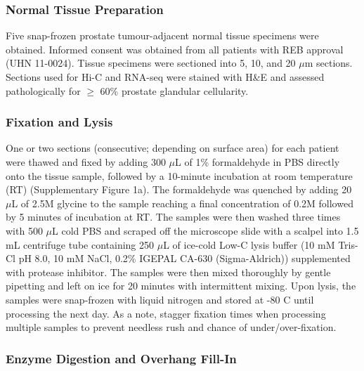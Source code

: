 \subsubsection{Normal Tissue Preparation}

Five snap-frozen prostate tumour-adjacent normal tissue specimens were obtained.
Informed consent was obtained from all patients with REB approval (UHN 11-0024).
Tissue specimens were sectioned into 5, 10, and 20 $\mu$m sections.
Sections used for Hi-C and RNA-seq were stained with H\&E and assessed pathologically for $\ge$ 60\% prostate glandular cellularity.

\subsubsection{Fixation and Lysis}

One or two sections (consecutive; depending on surface area) for each patient were thawed and fixed by adding 300 $\mu$L of 1\% formaldehyde in PBS directly onto the tissue sample, followed by a 10-minute incubation at room temperature (RT) (Supplementary Figure 1a).
The formaldehyde was quenched by adding 20 $\mu$L of 2.5M glycine to the sample reaching a final concentration of 0.2M followed by 5 minutes of incubation at RT.
The samples were then washed three times with 500 $\mu$L cold PBS and scraped off the microscope slide with a scalpel into 1.5 mL centrifuge tube containing 250 $\mu$L of ice-cold Low-C lysis buffer (10 mM Tris-Cl pH 8.0, 10 mM NaCl, 0.2\% IGEPAL CA-630 (Sigma-Aldrich)) supplemented with protease inhibitor.
The samples were then mixed thoroughly by gentle pipetting and left on ice for 20 minutes with intermittent mixing.
Upon lysis, the samples were snap-frozen with liquid nitrogen and stored at -80 \textdegree C until processing the next day.
As a note, stagger fixation times when processing multiple samples to prevent needless rush and chance of under/over-fixation.

\subsubsection{Enzyme Digestion and Overhang Fill-In}

